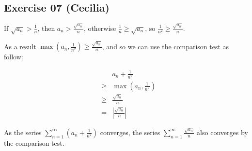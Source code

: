 \subsection*{Exercise 07 (Cecilia)}

If $ \sqrt{a_n} > \frac{1}{n} $, then $ a_n > \frac{\sqrt{a_n}}{n} $, otherwise $ \frac{1}{n} \ge \sqrt{a_n} $, so $ \frac{1}{n^2} \ge \frac{\sqrt{a_n}}{n} $.

As a result $ \max\left(a_n, \frac{1}{n^2}\right) \ge \frac{\sqrt{a_n}}{n} $, and so we can use the comparison test as follow:

\begin{eqnarray*}
  &   & a_n + \frac{1}{n^2} \\
  &\ge& \max\left(a_n, \frac{1}{n^2}\right) \\
  &\ge& \frac{\sqrt{a_n}}{n} \\
  & = & \left|\frac{\sqrt{a_n}}{n}\right|
\end{eqnarray*}

As the series $ \sum\limits_{n = 1}^{\infty} (a_n + \frac{1}{n^2}) $ converges, the series $ \sum\limits_{n = 1}^{\infty} \frac{\sqrt{a_n}}{n} $ also converges by the comparison test.
